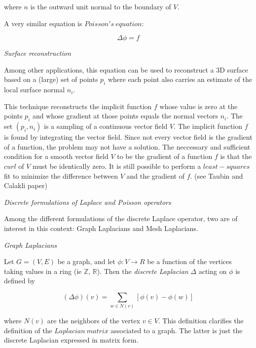 \documentclass[a4paper,11pt]{article}
\begin{document}
where $n$ is the outward unit normal to the boundary of $V$.

\bigskip

A very similar equation is $Poisson's \ equation$:

$$\Delta \phi = f$$

\emph{Surface reconstruction}

\bigskip 

Among other applications, this equation can be used to reconstruct a 3D 
surface based on a (large) set of points $p_i$ where each point also 
carries an estimate of the local surface normal $n_i$.

\bigskip

This technique reconstructs the implicit function $f$ whose value is 
zero at the points $p_i$ and whose gradient at those points equals the 
normal vectors $n_i$. The set $(p_i, n_i)$ is a sampling of a 
continuous vector field $V$. The implicit function $f$ is found by 
integrating the vector field. Since not every vector field is the 
gradient of a function, the problem may not have a solution. The 
neccessary and sufficient condition for a smooth vector field $V$ to be 
the gradient of a function $f$ is that the $curl$ of $V$ must be 
identically zero. It is still possible to perform a $least-squares$ fit 
to minimize the difference between $V$ and the gradient of $f$. (see 
Taubin and Calakli paper)

\bigskip

\emph{Discrete formulations of Laplace and Poisson operators}

\bigskip

Among the different formulations of the discrete Laplace operator, two 
are of interest in this context: Graph Laplacians and Mesh Laplacians.

\bigskip

\textit{Graph Laplacians}

\bigskip

Let $G=(V,E)$ be a graph, and let $\phi: V \rightarrow R$ be a function 
of the vertices taking values in a ring (ie $\mathbb{Z}$, $\mathbb{R}$). 
Then the \textit{discrete Laplacian} $\Delta$ acting on $\phi$ is defined by

$$(\Delta \phi)(v) = \sum_{w \in N(v)} [\phi(v) - \phi(w)]$$

where $N(v)$ are the neighbors of the vertex $v \in V$. This definition 
clarifies the definition of the $Laplacian \ matrix$ associated to a 
graph. The latter is just the discrete Laplacian expressed in matrix 
form.
\end{document}
